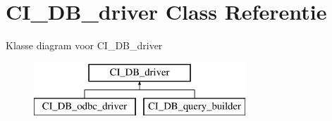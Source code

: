 \hypertarget{class_c_i___d_b__driver}{}\section{C\+I\+\_\+\+D\+B\+\_\+driver Class Referentie}
\label{class_c_i___d_b__driver}
Klasse diagram voor C\+I\+\_\+\+D\+B\+\_\+driver\begin{figure}[H]
\begin{center}
\leavevmode
\includegraphics[height=2.000000cm]{class_c_i___d_b__driver}
\end{center}
\end{figure}
